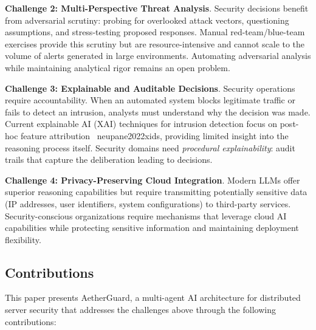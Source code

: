 \textbf{Challenge 2: Multi-Perspective Threat Analysis}. Security decisions benefit from adversarial scrutiny: probing for overlooked attack vectors, questioning assumptions, and stress-testing proposed responses. Manual red-team/blue-team exercises provide this scrutiny but are resource-intensive and cannot scale to the volume of alerts generated in large environments. Automating adversarial analysis while maintaining analytical rigor remains an open problem.

\textbf{Challenge 3: Explainable and Auditable Decisions}. Security operations require accountability. When an automated system blocks legitimate traffic or fails to detect an intrusion, analysts must understand why the decision was made. Current explainable AI (XAI) techniques for intrusion detection focus on post-hoc feature attribution~
{neupane2022xids}, providing limited insight into the reasoning process itself. Security domains need \textit{procedural explainability}: audit trails that capture the deliberation leading to decisions.

\textbf{Challenge 4: Privacy-Preserving Cloud Integration}. Modern LLMs offer superior reasoning capabilities but require transmitting potentially sensitive data (IP addresses, user identifiers, system configurations) to third-party services. Security-conscious organizations require mechanisms that leverage cloud AI capabilities while protecting sensitive information and maintaining deployment flexibility.

\subsection{Contributions}
\label{subsec:contributions}

This paper presents AetherGuard, a multi-agent AI architecture for distributed server security that addresses the challenges above through the following contributions:

